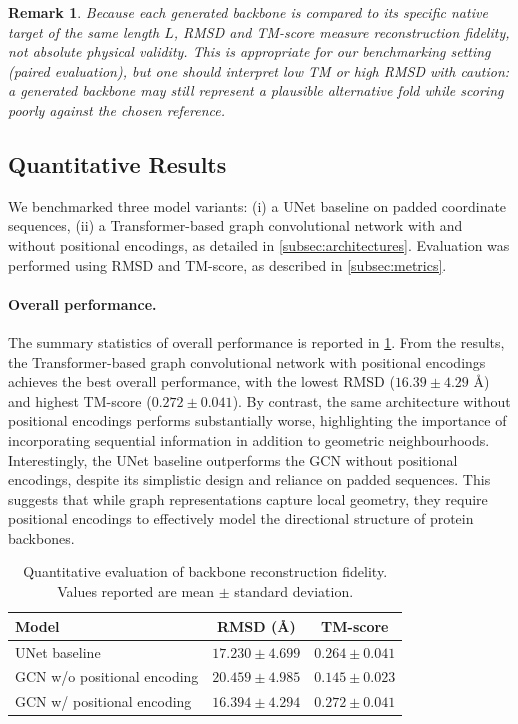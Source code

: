 \documentclass[a4paper,12pt]{article}
\newtheorem{remark}{Remark}[section]
\begin{document}
\begin{remark}
    Because each generated backbone is compared to its specific native target of the same length \(L\), RMSD and TM-score measure reconstruction fidelity, not absolute physical validity. This is appropriate for our benchmarking setting (paired evaluation), but one should interpret low TM or high RMSD with caution: a generated backbone may still represent a plausible alternative fold while scoring poorly against the chosen reference.
\end{remark}

\subsection{Quantitative Results}\label{subsec:results}
We benchmarked three model variants: (i) a UNet baseline on padded coordinate 
sequences, (ii) a Transformer-based graph convolutional network with and without positional 
encodings, as detailed in \cref{subsec:architectures}. Evaluation was performed using RMSD and TM-score, as described in \cref{subsec:metrics}.

\paragraph{Overall performance.}
The summary statistics of overall performance is reported in \cref{tab:quant-results}. From the results, the Transformer-based graph convolutional network with positional encodings achieves the best overall performance, with the lowest RMSD (\(16.39 \pm 4.29\) \AA) and highest TM-score (\(0.272 \pm 0.041\)). By contrast, the same architecture without positional encodings performs substantially worse, highlighting the importance of incorporating sequential information in addition to geometric neighbourhoods. Interestingly, the UNet baseline outperforms the GCN without positional encodings, despite its simplistic design and reliance on padded sequences. This suggests that while graph representations capture local geometry, they require positional encodings to effectively model the directional structure of protein backbones.

\begin{table}[htbp]
    \centering
    \caption{Quantitative evaluation of backbone reconstruction fidelity. 
    Values reported are mean \(\pm\) standard deviation.}
    \label{tab:quant-results}
    \begin{tabular}{lcc}
        \toprule
        Model & RMSD (\AA) & TM-score \\
        \midrule
        UNet baseline & \(17.230 \pm 4.699\) & \(0.264 \pm 0.041\) \\
        GCN w/o positional encoding & \(20.459 \pm 4.985\) & \(0.145 \pm 0.023\) \\
        GCN w/ positional encoding & \(16.394 \pm 4.294\) & \(0.272 \pm 0.041\) \\
        \bottomrule
    \end{tabular}
\end{table}
\end{document}
